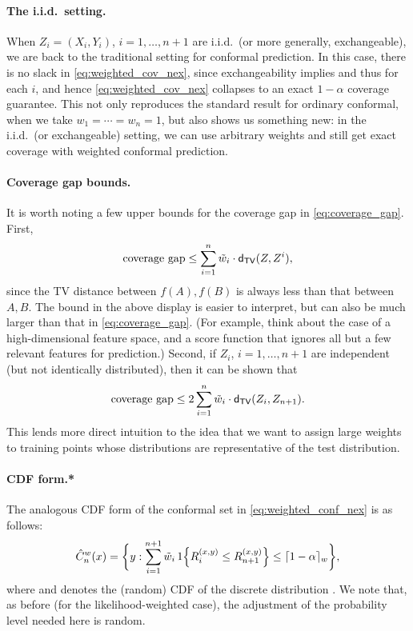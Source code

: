 \documentclass{article}
\begin{document}
\paragraph{The i.i.d.\ setting.}

When $Z_i=(X_i,Y_i)$, $i=1,\dots,n+1$ are i.i.d.\ (or more generally,
exchangeable), we are back to the traditional setting for conformal
prediction. In this case, there is no slack in \eqref{eq:weighted_cov_nex},
since exchangeability implies  and thus
 for each $i$, and hence
\eqref{eq:weighted_cov_nex} collapses to an exact $1-\alpha$ coverage
guarantee. This not only reproduces the standard result for ordinary conformal,
when we take $w_1 = \cdots = w_n = 1$, but also shows us something  
new: in the i.i.d.\ (or exchangeable) setting, we can use arbitrary weights and
still get exact coverage with weighted conformal prediction.

\paragraph{Coverage gap bounds.}

It is worth noting a few upper bounds for the coverage gap in
\eqref{eq:coverage_gap}. First, 
\[
\text{coverage gap} \leq \sum_{i=1}^n \tilde{w}_i \cdot \mathsf{d}_{\mathsf{TV}}(Z, Z^i),
\]
since the TV distance between $f(A),f(B)$ is always less than that between
$A,B$. The bound in the above display is easier to interpret, but can also be
much larger than that in \eqref{eq:coverage_gap}. (For example, think about the
case of a high-dimensional feature space, and a score function that ignores all
but a few relevant features for prediction.) Second, if $Z_i$, $i=1,\dots,n+1$
are independent (but not identically distributed), then it can be shown that 
\[
\text{coverage gap} \leq 2\sum_{i=1}^n \tilde{w}_i \cdot \mathsf{d}_{\mathsf{TV}}(Z_i, Z_{n+1}).
\]
This lends more direct intuition to the idea that we want to assign large
weights to training points whose distributions are representative of the test 
distribution. 

\paragraph{CDF form.*}

The analogous CDF form of the conformal set in \eqref{eq:weighted_conf_nex} is
as follows: 
\begin{equation}
\label{eq:weighted_cdf_nex}
\hat{C}^w_n(x) = \bigg\{ y : \sum_{i=1}^{n+1} \tilde{w}_i \, 1\Big\{ R_i^{(x,y)} \leq
R^{(x,y)}_{n+1} \Big\} \leq \lceil 1-\alpha \rceil_w \bigg\},
\end{equation}
where  and  denotes the (random) CDF of the
discrete distribution . We note that, as before (for the
likelihood-weighted case), the adjustment of the probability level needed here
is random.  
\end{document}
